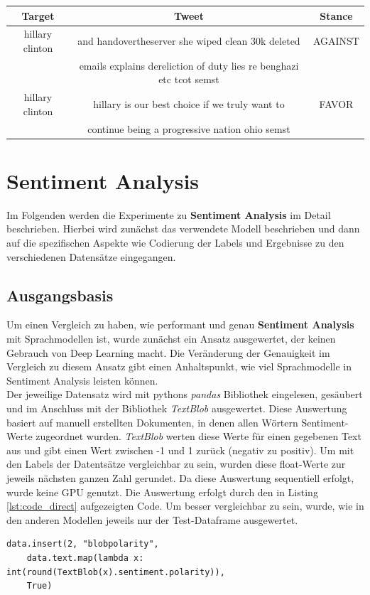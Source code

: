 \begin{center}
\begin{tabular}{|c|c|c|}
\hline
Target & Tweet & Stance\\ 
\hline\hline
 hillary clinton & and  handovertheserver she wiped clean  30k deleted & AGAINST\\
  & emails  explains dereliction of duty  lies re benghazi  etc tcot semst  &\\
\hline
hillary clinton & hillary is our best choice if we truly want to & FAVOR\\
&  continue being a progressive nation  ohio semst &\\
\hline    
\end{tabular}
\end{center}

\section{Sentiment Analysis}
Im Folgenden werden die Experimente zu \textbf{Sentiment Analysis} im Detail beschrieben. Hierbei wird zun\"achst das verwendete Modell beschrieben und dann auf die spezifischen Aspekte wie Codierung der Labels und Ergebnisse zu den verschiedenen Datens\"atze eingegangen. 

\subsection{Ausgangsbasis}
Um einen Vergleich zu haben, wie performant und genau \textbf{Sentiment Analysis} mit Sprachmodellen ist, wurde zun\"achst ein Ansatz ausgewertet, der keinen Gebrauch von Deep Learning macht. Die Ver\"anderung der Genauigkeit im Vergleich zu diesem Ansatz gibt einen Anhaltspunkt, wie viel Sprachmodelle in Sentiment Analysis leisten k\"onnen.\\
Der jeweilige Datensatz wird mit pythons \textit{pandas} Bibliothek eingelesen, ges\"aubert und im Anschluss mit der Bibliothek \textit{TextBlob} ausgewertet. Diese Auswertung basiert auf manuell erstellten Dokumenten, in denen allen W\"ortern Sentiment-Werte zugeordnet wurden. \textit{TextBlob} werten diese Werte f\"ur einen gegebenen Text aus und gibt einen Wert zwischen -1 und 1 zur\"uck (negativ zu positiv). Um mit den Labels der Datents\"atze vergleichbar zu sein, wurden diese float-Werte zur jeweils n\"achsten ganzen Zahl gerundet. Da diese Auswertung sequentiell erfolgt, wurde keine GPU genutzt. Die Auswertung erfolgt durch den in Listing \ref{lst:code_direct} aufgezeigten Code. Um besser vergleichbar zu sein, wurde, wie in den anderen Modellen jeweils nur der Test-Dataframe ausgewertet.
\lstset{language=Python}
\lstset{frame=lines}
\lstset{captionpos=b}
\lstset{basicstyle=\footnotesize}
\begin{lstlisting}
data.insert(2, "blobpolarity", 
	data.text.map(lambda x: int(round(TextBlob(x).sentiment.polarity)), 
	True)
\end{lstlisting}

